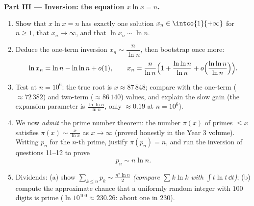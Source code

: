 \begin{problem}
\medskip
\noindent\textbf{Part III --- Inversion: the equation $x\ln x =
n$.}
\begin{enumerate}[resume]
  \item Show that $x\ln x = n$ has exactly one solution $x_n \in
        \intco{1}{+\infty}$ for $n \geq 1$, that $x_n \to
        \infty$, and that $\ln x_n \sim \ln n$.
  \item Deduce the one-term inversion $x_n \sim
        \dfrac{n}{\ln n}$, then bootstrap once more:
        \[
        \ln x_n = \ln n - \ln\ln n + o(1),
        \qquad
        x_n = \frac{n}{\ln n}\Bigl(1 + \frac{\ln\ln n}{\ln n}
        + o\Bigl(\frac{\ln\ln n}{\ln n}\Bigr)\Bigr).
        \]
  \item Test at $n = 10^6$: the true root is $x \approx
        87\,848$; compare with the one-term ($\approx 72\,382$)
        and two-term ($\approx 86\,140$) values, and explain the
        slow gain (the expansion parameter is $\frac{\ln\ln
        n}{\ln n}$, only $\approx 0.19$ at $n = 10^6$).
  \item We now \emph{admit} the prime number theorem: the number
        $\pi(x)$ of primes $\leq x$ satisfies $\pi(x) \sim
        \frac{x}{\ln x}$ as $x \to \infty$ (proved honestly in
        the Year 3 volume). Writing $p_n$ for the $n$-th prime,
        justify $\pi(p_n) = n$, and run the inversion of
        questions 11--12 to prove
        \[
        p_n \sim n \ln n .
        \]
  \item Dividends: (a) show $\sum_{k \leq n} p_k \sim
        \frac{n^2\ln n}{2}$ \emph{(compare $\sum k\ln k$ with
        $\int t\ln t\,\dd t$)}; (b) compute the approximate
        chance that a uniformly random integer with $100$
        digits is prime ($\ln 10^{100} \approx 230.26$: about
        one in $230$).
\end{enumerate}


\end{problem}
